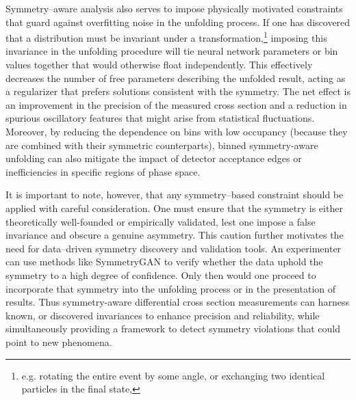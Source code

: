         Symmetry--aware analysis also serves to impose physically motivated constraints that guard against overfitting noise in the unfolding process.
        If one has discovered that a distribution must be invariant under a transformation,\footnote{e.g. rotating the entire event by some angle, or exchanging two identical particles in the final state,} imposing this invariance in the unfolding procedure will tie neural network parameters or bin values together that would otherwise float independently.
        This effectively decreases the number of free parameters describing the unfolded result, acting as a regularizer that prefers solutions consistent with the symmetry.
        The net effect is an improvement in the precision of the measured cross section and a reduction in spurious oscillatory features that might arise from statistical fluctuations.
        Moreover, by reducing the dependence on bins with low occupancy (because they are combined with their symmetric counterparts), binned symmetry-aware unfolding can also mitigate the impact of detector acceptance edges or inefficiencies in specific regions of phase space.

        It is important to note, however, that any symmetry--based constraint should be applied with careful consideration. One must ensure that the symmetry is either theoretically well-founded or empirically validated, lest one impose a false invariance and obscure a genuine asymmetry.
        This caution further motivates the need for data--driven symmetry discovery and validation tools.
        An experimenter can use methods like SymmetryGAN to verify whether the data uphold the symmetry to a high degree of confidence.
        Only then would one proceed to incorporate that symmetry into the unfolding process or in the presentation of results.
        Thus symmetry-aware differential cross section measurements can harness known, or discovered invariances to enhance precision and reliability, while simultaneously providing a framework to detect symmetry violations that could point to new phenomena.
    
